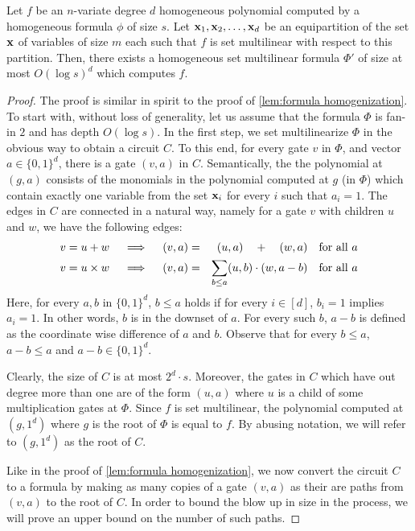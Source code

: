 \begin{lemma}\label{lem:formula set-multilinearization}
Let $f$ be an $n$-variate degree $d$ homogeneous polynomial computed by a homogeneous formula $\phi$ of size $s$. Let $\mathbf{x}_1, \mathbf{x}_2, \ldots, \mathbf{x}_d$ be an equipartition of the set $\mathbf{x}$ of variables of size $m$ each such that $f$ is set multilinear with respect to this partition. Then, there exists a homogeneous set multilinear formula $\Phi'$ of size at most $O(\log s)^d$ which computes $f$. 
\end{lemma}
\begin{proof}
The proof is similar in spirit to the proof of \autoref{lem:formula homogenization}. To start with, without loss of generality, let us assume that the formula $\Phi$ is fan-in $2$ and has depth $O(\log s)$. 
In the first step, we  set multilinearize $\Phi$ in the obvious way to obtain a circuit $C$. To this end, for every gate $v$ in $\Phi$, and vector $a \in \{0,1\}^d$, there is a gate $(v, a)$ in $C$. Semantically, the the polynomial at $(g,a)$ consists of the monomials in the polynomial computed at $g$ (in $\Phi$) which contain exactly one variable from the  set $\mathbf{x}_i$ for every $i$ such that $a_i = 1$. The edges in $C$ are connected in a natural way, namely for a gate $v$ with children $u$ and $w$, we have the following edges:
\begin{eqnarray*}
\text{$v = u + w$}\quad\implies\quad (v, a) &=& (u, a) \quad + \quad (w, a)\quad\text{for all $a$}\\
\text{$v = u \times w$}\quad\implies\quad (v, a) &=& \sum_{b \leq a} (u, b)\cdot (w, a-b) \quad\text{for all $a$}
\end{eqnarray*}
 Here, for every $a, b$ in $\{0,1\}^d$, $b \leq a $ holds if for every $i \in [d]$, $b_i = 1$ implies $a_i = 1$. In other words, $b$ is in the downset of $a$. For every such $b$, $a-b$ is defined as the coordinate wise difference of $a$ and $b$. Observe that for every $b \leq a$, $a-b \leq a$ and $a-b \in \{0,1\}^d$.  
 
Clearly, the size of $C$ is at most $2^d\cdot s$. Moreover, the gates in $C$ which have out degree more than one  are of the form $(u,a)$ where $u$ is a child of some multiplication gates at $\Phi$. Since $f$ is set multilinear, the polynomial computed at $(g, 1^d)$ where $g$ is the root of $\Phi$ is equal to $f$. By abusing notation, we will refer to $(g, 1^d)$ as the root of $C$. 
 
Like in the proof of \autoref{lem:formula homogenization}, we now convert the circuit $C$ to a formula by making as many copies of a gate  $(v, a)$ as their are paths from  $(v,a)$ to the root of $C$. In order to bound the blow up in size in the process, we will prove an upper bound on the number of such paths. 


\end{proof}
